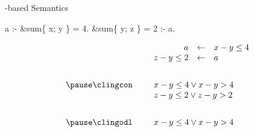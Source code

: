 \begin{frame}{\HTC-based Semantics}
    \begin{semiverbatim}
                     a :- &sum\{ x; y \} = 4.
      &sum\{ y; z \} = 2 :- a.
  \end{semiverbatim}
  \bigskip
  \[
    \begin{array}{rp{5pt}rcl}
                     && a         &\leftarrow&  x-y\leq 4          \\
                     && z-y\leq2  &\leftarrow&  a                  \\[20pt]\pause
    \text{\clingcon} && \multicolumn{3}{l}{x-y\leq 4 \lor x-y > 4} \\
                     && \multicolumn{3}{l}{z-y\leq 2 \lor z-y>2}   \\[20pt]\pause
    \text{\clingodl} && \multicolumn{3}{l}{x-y\leq 4 \lor x-y > 4}
    \end{array}
  \]
\end{frame}
%
